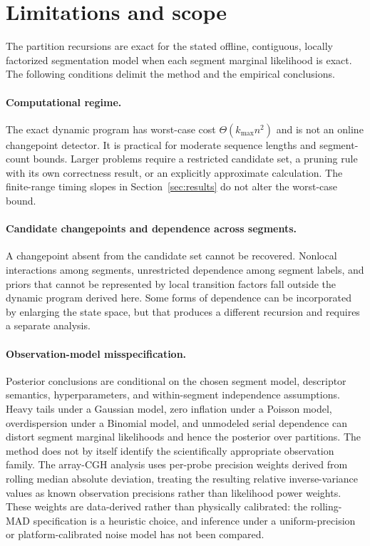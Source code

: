 \section{Limitations and scope}
\label{sec:limitations}

The partition recursions are exact for the stated offline, contiguous, locally factorized segmentation model when each segment marginal likelihood is exact. The following conditions delimit the method and the empirical conclusions.

\paragraph{Computational regime.}
The exact dynamic program has worst-case cost $\Theta(k_{\max}n^2)$ and is not an online changepoint detector. It is practical for moderate sequence lengths and segment-count bounds. Larger problems require a restricted candidate set, a pruning rule with its own correctness result, or an explicitly approximate calculation. The finite-range timing slopes in Section~\ref{sec:results} do not alter the worst-case bound.

\paragraph{Candidate changepoints and dependence across segments.}
A changepoint absent from the candidate set cannot be recovered. Nonlocal interactions among segments, unrestricted dependence among segment labels, and priors that cannot be represented by local transition factors fall outside the dynamic program derived here. Some forms of dependence can be incorporated by enlarging the state space, but that produces a different recursion and requires a separate analysis.

\paragraph{Observation-model misspecification.}
Posterior conclusions are conditional on the chosen segment model, descriptor semantics, hyperparameters, and within-segment independence assumptions. Heavy tails under a Gaussian model, zero inflation under a Poisson model, overdispersion under a Binomial model, and unmodeled serial dependence can distort segment marginal likelihoods and hence the posterior over partitions. The method does not by itself identify the scientifically appropriate observation family. The array-CGH analysis uses per-probe precision weights derived from rolling median absolute deviation, treating the resulting relative inverse-variance values as known observation precisions rather than likelihood power weights. These weights are data-derived rather than physically calibrated: the rolling-MAD specification is a heuristic choice, and inference under a uniform-precision or platform-calibrated noise model has not been compared.

